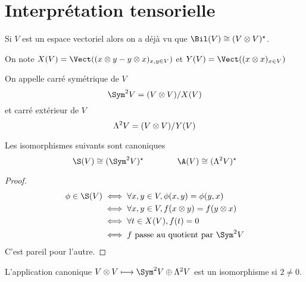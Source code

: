 \section{Interprétation tensorielle}

Si $V$ est un espace vectoriel alors on a déjà vu que  $\Bil(V)\cong (V\tens V)^\star$.

 \begin{dfn}
     On note $X(V)=\Vect((x\tens y-y\tens x)_{x,y \in  V})$ et $Y(V)=\Vect((x\tens x)_{x \in  V})$
\end{dfn}

\begin{dfn}
    On appelle carré symétrique de $V$ \[
    \Sym ^2 V=(V\tens V) / X(V)
\] 
et carré extérieur de  $V$  \[
    \Lambda ^2 V = (V\otimes V) / Y(V)
\] 
\end{dfn}

\begin{prop}
Les isomorphismes suivants sont canoniques \[
    \S(V)\cong (\Sym^2 V)^\star \qquad  \qquad  \A(V)\cong (\Lambda ^2 V)^\star
\] 
\end{prop}

\begin{proof}
\begin{align*}
    \phi \in  \S(V) &\iff  \forall  x, y \in  V, \phi(x, y) = \phi(y, x)\\ & \iff  \forall  x, y \in  V, f(x\tens y)=f(y\tens x) \\
                    & \iff  \forall  t \in  X(V), f(t)=0\\
                    & \iff  f\text{ passe au quotient par } \Sym^2 V
\end{align*}
C'est pareil pour l'autre.
\end{proof}

\begin{prop}
L'application canonique $V\tens V \longmapsto \Sym^2 V \oplus \Lambda^2 V$ est un isomorphisme si $2\neq 0$.
\end{prop}

